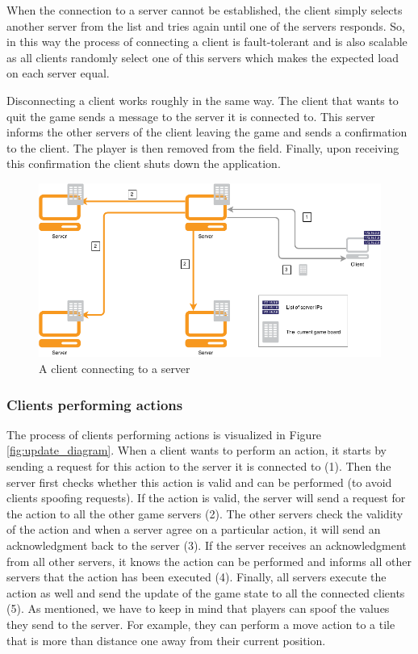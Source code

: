 When the connection to a server cannot be established, the client simply selects another server from the list and tries again until one of the servers responds. 
So, in this way the process of connecting a client is fault-tolerant and is also scalable as all clients randomly select one of this servers which makes the expected load on each server equal.

Disconnecting a client works roughly in the same way. 
The client that wants to quit the game sends a message to the server it is connected to. 
This server informs the other servers of the client leaving the game and sends a confirmation to the client. 
The player is then removed from the field. Finally, upon receiving this confirmation the client shuts down the application.

\begin{figure}[h!]
  \centering
    \includegraphics[width=\textwidth]{diagrams/connecting-client}
    
  \caption{A client connecting to a server}
  \label{fig:connect_diagram}
\end{figure}

\subsubsection{Clients performing actions}
\label{subsubsec:clients_actions}
The process of clients performing actions is visualized in Figure \ref{fig:update_diagram}. 
When a client wants to perform an action, it starts by sending a request for this action to the server it is connected to (1). 
Then the server first checks whether this action is valid and can be performed (to avoid clients spoofing requests). 
If the action is valid, the server will send a request for the action to all the other game servers (2). 
The other servers check the validity of the action and when a server agree on a particular action, it will send an acknowledgment back to the server (3). 
If the server receives an acknowledgment from all other servers, it knows the action can be performed and informs all other servers that the action has been executed (4). 
Finally, all servers execute the action as well and send the update of the game state to all the connected clients (5). 
As mentioned, we have to keep in mind that players can spoof the values they send to the server. 
For example, they can perform a move action to a tile that is more than distance one away from their current position.

